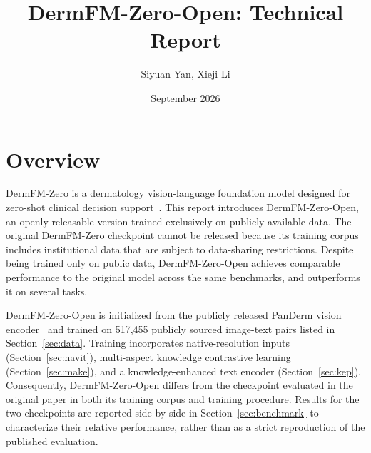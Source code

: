 \documentclass{article}
\title{DermFM-Zero-Open: Technical Report}
\author{Siyuan Yan, Xieji Li}
\date{September 2026}
\begin{document}
\maketitle

\section{Overview}
\label{sec:overview}

DermFM-Zero is a dermatology vision-language foundation model designed for zero-shot clinical decision support~\cite{dermfmzero}. This report introduces DermFM-Zero-Open, an openly releasable version trained exclusively on publicly available data. The original DermFM-Zero checkpoint cannot be released because its training corpus includes institutional data that are subject to data-sharing restrictions. Despite being trained only on public data, DermFM-Zero-Open achieves comparable performance to the original model across the same benchmarks, and outperforms it on several tasks.

DermFM-Zero-Open is initialized from the publicly released PanDerm vision encoder~\cite{panderm} and trained on 517,455 publicly sourced image-text pairs listed in Section~\ref{sec:data}. Training incorporates native-resolution inputs (Section~\ref{sec:navit}), multi-aspect knowledge contrastive learning (Section~\ref{sec:make}), and a knowledge-enhanced text encoder (Section~\ref{sec:kep}). Consequently, DermFM-Zero-Open differs from the checkpoint evaluated in the original paper in both its training corpus and training procedure. Results for the two checkpoints are reported side by side in Section~\ref{sec:benchmark} to characterize their relative performance, rather than as a strict reproduction of the published evaluation.
\end{document}
